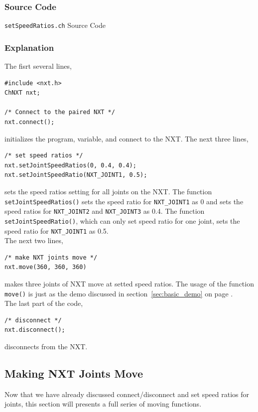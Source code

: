 \documentclass[11pt]{article}
\begin{document}
\subsubsection*{Source Code}
\begin{Program}[H]
    {\small}
    \caption{\texttt{setSpeedRatios.ch} Source Code\label{prog_setSpeedRatios.ch}}
\end{Program}

\subsubsection*{Explanation}
The fisrt several lines,
\begin{verbatim}
#include <nxt.h>
ChNXT nxt;

/* Connect to the paired NXT */
nxt.connect();
\end{verbatim}
initializes the program, variable, and connect to the NXT. The next three lines,
\begin{verbatim}
/* set speed ratios */
nxt.setJointSpeedRatios(0, 0.4, 0.4);
nxt.setJointSpeedRatio(NXT_JOINT1, 0.5);
\end{verbatim}
sets the speed ratios setting for all joints on the NXT. The function \texttt{setJointSpeedRatios()} sets 
the speed ratio for \texttt{NXT\_JOINT1} as 0 and sets the speed ratios for \texttt{NXT\_JOINT2} and 
\texttt{NXT\_JOINT3} as 0.4. The function \texttt{setJointSpeedRatio()}, which can only set speed ratio
for one joint, sets the speed ratio for \texttt{NXT\_JOINT1} as 0.5.\\

\noindent
The next two lines,
\begin{verbatim}
/* make NXT joints move */
nxt.move(360, 360, 360)
\end{verbatim}
makes three joints of NXT move at setted speed ratios. The usage of the function \texttt{move()} is just 
as the demo discussed in section~\ref{sec:basic_demo} on page \pageref{sec:basic_demo}.\\

\noindent
The last part of the code,
\begin{verbatim}
/* disconnect */
nxt.disconnect();
\end{verbatim}
disconnects from the NXT.\\

\subsection{\label{sec:move_demo}Making NXT Joints Move}
Now that we have already discussed connect/disconnect and set speed ratios for joints, this section will presents a full
series of moving functions.
\end{document}
